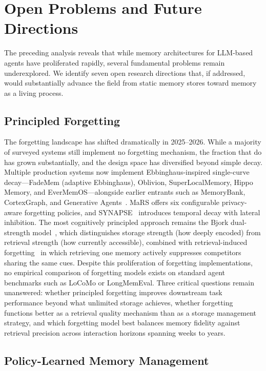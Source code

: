 \section{Open Problems and Future Directions}
\label{sec:open-problems}

The preceding analysis reveals that while memory architectures for
LLM-based agents have proliferated rapidly, several fundamental
problems remain underexplored. We identify seven open research
directions that, if addressed, would substantially advance the field
from static memory stores toward memory as a living process.

\subsection{Principled Forgetting}

The forgetting landscape has shifted dramatically in 2025--2026. While
a majority of surveyed systems still implement no forgetting mechanism,
the fraction that do has grown substantially, and the design space has
diversified beyond simple decay. Multiple production systems now
implement Ebbinghaus-inspired single-curve decay---FadeMem (adaptive
Ebbinghaus), Oblivion, SuperLocalMemory, Hippo Memory, and
EverMemOS---alongside earlier entrants such as MemoryBank, CortexGraph,
and Generative Agents~\cite{park2023generative}. MaRS offers six
configurable privacy-aware forgetting policies, and
SYNAPSE~\cite{jiang2026synapse} introduces temporal decay with lateral
inhibition. The most cognitively principled approach remains the Bjork
dual-strength model~\cite{bjork1992}, which distinguishes storage
strength (how deeply encoded) from retrieval strength (how currently
accessible), combined with retrieval-induced
forgetting~\cite{anderson1994} in which retrieving one memory actively
suppresses competitors sharing the same cues. Despite this proliferation
of forgetting implementations, no empirical
comparison of forgetting models exists on standard agent benchmarks
such as LoCoMo or LongMemEval. Three critical questions remain
unanswered: whether principled forgetting improves downstream task
performance beyond what unlimited storage achieves, whether forgetting
functions better as a retrieval quality mechanism than as a storage
management strategy, and which forgetting model best balances memory
fidelity against retrieval precision across interaction horizons
spanning weeks to years.

\subsection{Policy-Learned Memory Management}
\label{sec:rl-memory}


